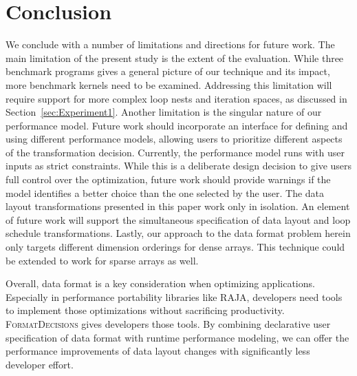 \documentclass[sigconf,review=true]{acmart}
\newcommand{\FormatDecisions}[0]{{\textsc{FormatDecisions}}}
\begin{document}
\section{Conclusion}


We conclude with a number of limitations and directions for future work.
The main limitation of the present study is the extent of the evaluation.
While three benchmark programs gives a general picture of our technique and its impact, more benchmark kernels need to be examined.
Addressing this limitation will require support for more complex loop nests and iteration spaces, as discussed in Section~\ref{sec:Experiment1}.
Another limitation is the singular nature of our performance model.
Future work should incorporate an interface for defining and using different performance models, allowing users to prioritize different aspects of the transformation decision.
Currently, the performance model runs with user inputs as strict constraints.
While this is a deliberate design decision to give users full control over the optimization, future work should provide warnings if the model identifies a better choice than the one selected by the user. 
The data layout transformations presented in this paper work only in isolation. 
An element of future work will support the simultaneous specification of data layout and loop schedule transformations. 
Lastly, our approach to the data format problem herein only targets different dimension orderings for dense arrays. 
This technique could be extended to work for sparse arrays as well. 

Overall, data format is a key consideration when optimizing applications.
Especially in performance portability libraries like RAJA, developers need tools to implement those optimizations without sacrificing productivity.
\FormatDecisions{} gives developers those tools.
By combining declarative user specification of data format with runtime performance modeling, we can offer the performance improvements of data layout changes with significantly less developer effort.
 \balance



\end{document}

